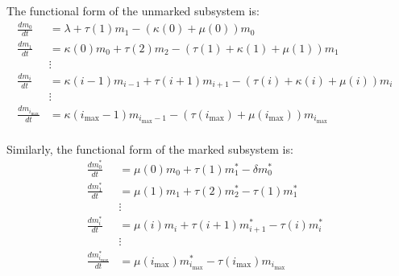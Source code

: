 \documentclass[review]{elsarticle}
\newcommand{\imax}{\ensuremath{i_{\max}}\xspace}
\begin{document}
The functional form of the unmarked subsystem is:
\begin{align*}
\frac{dm_{0}}{dt} &= \lambda+\tau(1)m_{1}-\left(\kappa(0) + \mu(0)\right)m_{0} \\
\frac{dm_{1}}{dt} &= \kappa(0)m_{0}+\tau(2)m_{2}-\left(\tau(1)+\kappa(1)+\mu(1)\right) m_{1}\\
& \vdots & \\
\frac{dm_{i}}{dt} &= \kappa(i-1)m_{i-1}+\tau(i+1)m_{i+1}-\left(\tau(i)+\kappa(i)+\mu(i)\right) m_{i} \\
& \vdots & \\
\frac{dm_{\imax}}{dt} &= \kappa(\imax-1)m_{\imax-1}-\left(\tau(\imax)+\mu(\imax)\right) m_{\imax}\\
\end{align*}

Similarly, the functional form of the marked subsystem is:
\begin{align*}
\frac{dm_{0}^{*}}{dt} &= \mu(0)m_{0}+\tau(1)m_{1}^{*}-\delta m_{0}^{*} \\
\frac{dm_{1}^{*}}{dt} &= \mu(1)m_{1}+\tau(2)m_{2}^{*}-\tau(1)m_{1}^{*} \\
& \vdots & \\
\frac{dm_{i}^{*}}{dt} &= \mu(i)m_{i}+\tau(i+1)m_{i+1}^{*}-\tau(i)m_{i}^{*} \\
& \vdots & \\
\frac{dm_{\imax}^{*}}{dt} &= \mu(\imax)m_{\imax}^{*}-\tau(\imax)m_{\imax} \\
\end{align*}
\end{document}
